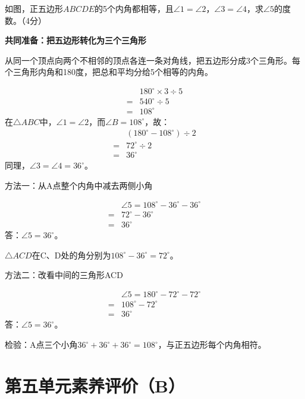 如图，正五边形\(ABCDE\)的5个内角都相等，且\(\angle1=\angle2\)，\allowbreak{}\(\angle3=\angle4\)，求\(\angle5\)的度数。（4分）\par
{}
\begin{BookAnswer}
\textbf{共同准备：把五边形转化为三个三角形}\par 从同一个顶点向两个不相邻的顶点各连一条对角线，把五边形分成3个三角形。每个三角形内角和180度，把总和平均分给5个相等的内角。\par \[\begin{aligned} &180^\circ\times3\div5\\={}&540^\circ\div5\\={}&108^\circ\end{aligned}\]在\(\triangle ABC\)中，\allowbreak{}\(\angle1=\angle2\)，而\(\angle B=108^\circ\)，故：\[\begin{aligned} &(180^\circ-108^\circ)\div2\\={}&72^\circ\div2\\={}&36^\circ\end{aligned}\]同理，\allowbreak{}\(\angle3=\angle4=36^\circ\)。\par 方法一：从A点整个内角中减去两侧小角\par \[\begin{aligned} &\angle5=108^\circ-36^\circ-36^\circ\\={}&72^\circ-36^\circ\\={}&36^\circ\end{aligned}\]答：\(\angle5=36^\circ\)。\par \(\triangle ACD\)在C、D处的角分别为\(108^\circ-36^\circ=72^\circ\)。\par 方法二：改看中间的三角形ACD\par \[\begin{aligned} &\angle5=180^\circ-72^\circ-72^\circ\\={}&108^\circ-72^\circ\\={}&36^\circ\end{aligned}\]答：\(\angle5=36^\circ\)。\par 检验：A点三个小角\(36^\circ+36^\circ+36^\circ=108^\circ\)，与正五边形每个内角相符。
\end{BookAnswer}


\section{第五单元素养评价（B）}

